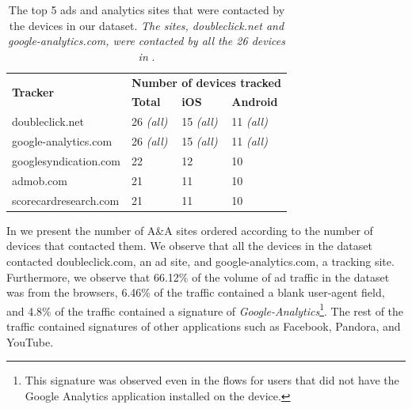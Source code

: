 \begin{table}
\centering
\begin{small}
\begin{tabular}{|p{}|p{}|p{}|p{}|}
\hline
\multirow{2}{*}{\bf Tracker} & \multicolumn{3}{c|}{\bf Number of devices tracked}\tabularnewline
\cline{2-4}
                      &  {\bf Total} & {\bf iOS} & {\bf Android} \tabularnewline
\hline
doubleclick.net       & 26 {\em(all)} & 15 {\em(all)} & 11 {\em(all)} \tabularnewline
\hline
google-analytics.com  & 26 {\em(all)} & 15 {\em(all)}  & 11 {\em(all)} \tabularnewline
\hline
googlesyndication.com & 22 & 12 & 10 \tabularnewline
\hline
admob.com             & 21 & 11 & 10 \tabularnewline
\hline
scorecardresearch.com &  21 & 11 & 10 \tabularnewline
\hline
\end{tabular}
\end{small}
\caption{The top 5 ads and analytics sites that were contacted by the devices in our dataset.
\emph{The sites, doubleclick.net and google-analytics.com, were contacted by all the 26 devices in} \mobWild.}
\label{tab:top-trackers}
\end{table}

In  we present the number of A\&A sites ordered according to the number of devices that contacted them.
We observe that all the devices in the \mobWild dataset contacted doubleclick.com, an ad site, and google-analytics.com, a tracking site.
Furthermore, we observe that 66.12\% of the volume of ad traffic in the \mobWild dataset was from the browsers, 6.46\% of the traffic contained a blank user-agent field, and 4.8\% of the traffic contained a signature of \emph{Google-Analytics}\footnote{This signature was observed even in the flows for users that did not have the Google Analytics application installed on the device.}.
The rest of the traffic contained signatures of other applications such as Facebook, Pandora, and YouTube.






